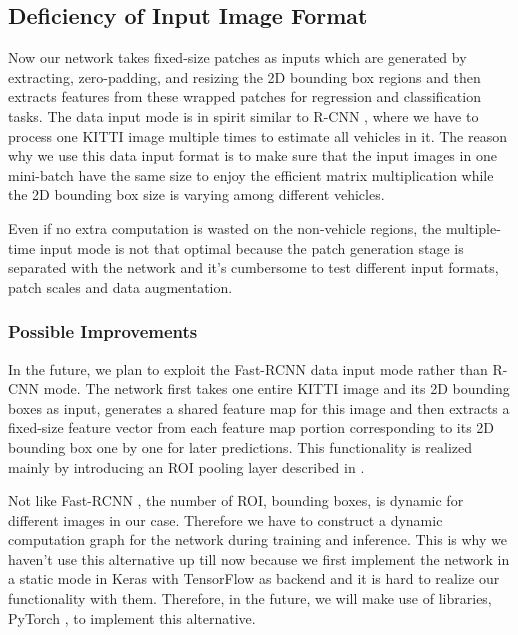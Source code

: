 \subsection{Deficiency of Input Image Format}

Now our network takes fixed-size patches as inputs which are generated by extracting, zero-padding, and resizing the 2D bounding box regions and then extracts features from these wrapped patches for regression and classification tasks. The data input mode is in spirit similar to R-CNN \cite{DBLP:journals/corr/GirshickDDM13}, where we have to process one KITTI image multiple times to estimate all vehicles in it. The reason why we use this data input format is to make sure that the input images in one mini-batch have the same size to enjoy the efficient matrix multiplication while the 2D bounding box size is varying among different vehicles.

Even if no extra computation is wasted on the non-vehicle regions, the multiple-time input mode is not that optimal because the patch generation stage is separated with the network and it's cumbersome to test different input formats, \ie patch scales and data augmentation.

\subsubsection{Possible Improvements}
In the future, we plan to exploit the Fast-RCNN \cite{DBLP:journals/corr/Girshick15} data input mode rather than R-CNN mode. The network first takes one entire KITTI image and its 2D bounding boxes as input, generates a shared feature map for this image and then extracts a fixed-size feature vector from each feature map portion corresponding to its 2D bounding box one by one for later predictions. This functionality is realized mainly by introducing an ROI pooling layer described in \cite{DBLP:journals/corr/Girshick15}.

Not like Fast-RCNN \cite{DBLP:journals/corr/Girshick15}, the number of ROI, \ie bounding boxes, is dynamic for different images in our case. Therefore we have to construct a dynamic computation graph for the network during training and inference. This is why we haven't use this alternative up till now because we first implement the network in a static mode in Keras \cite{chollet2015keras} with TensorFlow \cite{tensorflow2015-whitepaper} as backend and it is hard to realize our functionality with them. Therefore, in the future, we will make use of libraries, \ie PyTorch \cite{paszke2017automatic}, to implement this alternative.

